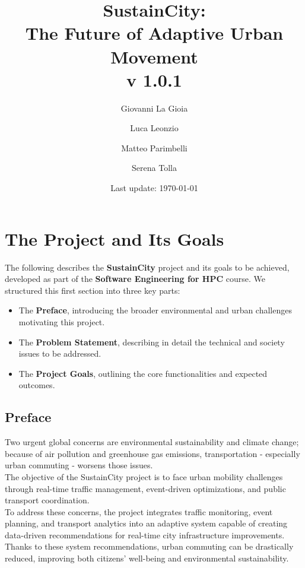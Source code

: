 \documentclass[a4paper,12pt]{article}
\title{SustainCity: \\ The Future of Adaptive Urban Movement \\ v 1.0.1} %
\author[1]{Giovanni La Gioia}
\author[2]{Luca Leonzio}
\author[3]{Matteo Parimbelli}
\author[4]{Serena Tolla}
\affil[1,2,3,4]{Politecnico di Milano}
\date{Last update: \today}
\begin{document}
\maketitle
\newpage
\tableofcontents
\clearpage
\newpage

\section{The Project and Its Goals}
The following describes the \textbf{SustainCity} project and its goals to be achieved, developed as part of the \textbf{Software Engineering for HPC} course. We structured this first section into three key parts:
\begin{itemize}
    \item The \textbf{Preface}, introducing the broader environmental and urban challenges motivating this project.
    \item The \textbf{Problem Statement}, describing in detail the technical and society issues to be addressed.
    \item The \textbf{Project Goals}, outlining the core functionalities and expected outcomes.
\end{itemize}

\subsection*{Preface}
Two urgent global concerns are environmental sustainability and climate change; because of air pollution and greenhouse gas emissions, transportation - especially urban commuting - worsens those issues. 
\\ The objective of the SustainCity project is to face urban mobility challenges through real-time traffic management, event-driven optimizations, and public transport coordination. 
\\ To address these concerns, the project integrates traffic monitoring, event planning, and transport analytics into an adaptive system capable of creating data-driven recommendations for real-time city infrastructure improvements. 
\\ Thanks to these system recommendations, urban commuting can be drastically reduced, improving both citizens’ well-being and environmental sustainability.
\end{document}
